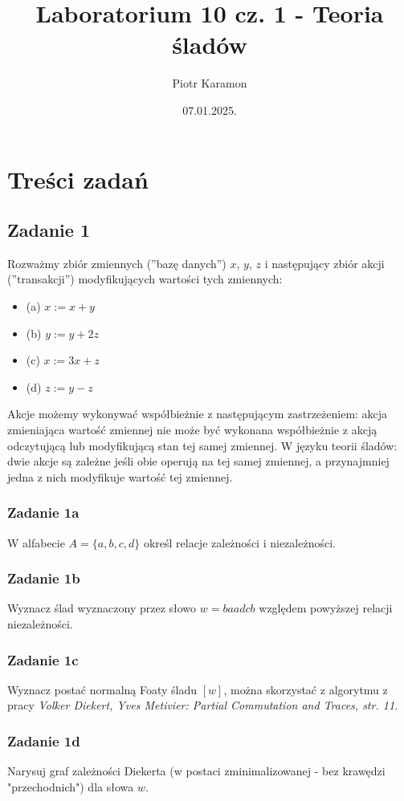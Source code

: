 \documentclass[11pt]{article}
\author{Piotr Karamon}
\date{07.01.2025.}
\title{Laboratorium 10 cz. 1 - Teoria śladów}
\begin{document}
\maketitle
\section*{Treści zadań}
\label{sec:orge725ef2}
\subsection*{Zadanie 1}
\label{sec:org79dcfef}
Rozważmy zbiór zmiennych (''bazę danych'') \(x\), \(y\), \(z\)
i następujący zbiór akcji (''transakcji'') modyfikujących wartości tych zmiennych:

\begin{itemize}
\item (a) \(x := x + y\)
\item (b) \(y := y + 2z\)
\item (c) \(x := 3x + z\)
\item (d) \(z := y - z\)
\end{itemize}

Akcje możemy wykonywać współbieżnie z następującym zastrzeżeniem: akcja zmieniająca wartość zmiennej nie może być wykonana współbieżnie z akcją odczytującą lub modyfikującą stan tej samej zmiennej. W języku teorii śladów: dwie akcje są zależne jeśli obie operują na tej samej zmiennej, a przynajmniej jedna z nich modyfikuje wartość tej zmiennej.
\subsubsection*{Zadanie 1a}
\label{sec:org95b23ea}
W alfabecie \(A = \{a, b, c, d\}\) określ relacje zależności i niezależności.
\subsubsection*{Zadanie 1b}
\label{sec:org4a9932a}
Wyznacz ślad wyznaczony przez słowo \(w = baadcb\) względem powyższej relacji niezależności.
\subsubsection*{Zadanie 1c}
\label{sec:orgc7290c6}
Wyznacz postać normalną Foaty śladu \([w]\), można skorzystać z algorytmu z pracy
\emph{Volker Diekert, Yves Metivier: Partial Commutation and Traces, str. 11.}
\subsubsection*{Zadanie 1d}
\label{sec:orgdeca710}
Narysuj graf zależności Diekerta (w postaci zminimalizowanej - bez krawędzi "przechodnich") dla słowa \(w\).
\end{document}
